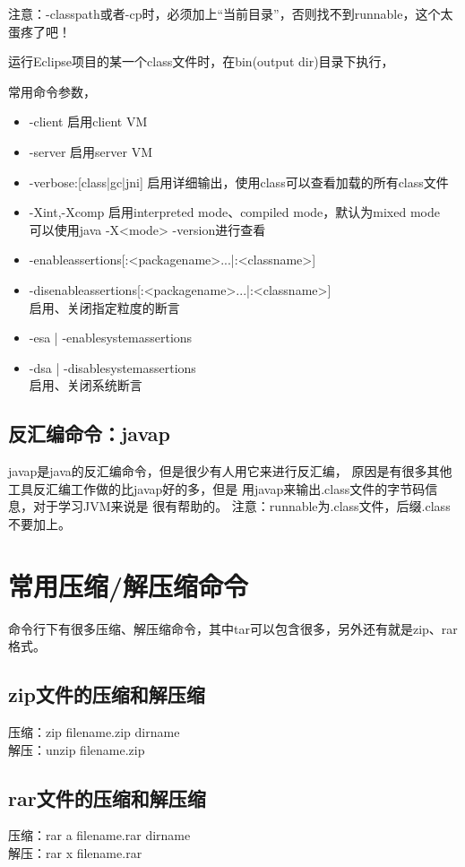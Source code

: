 ﻿\documentclass[a4paper,11pt]{article}
\begin{document}
  注意：-classpath或者-cp时，必须加上“当前目录”，否则找不到runnable，这个太蛋疼了吧！

  运行Eclipse项目的某一个class文件时，在bin(output dir)目录下执行，

  常用命令参数，

  \begin{itemize}
    \item -client 启用client VM
    \item -server 启用server VM
    \item -verbose:[class|gc|jni] 启用详细输出，使用class可以查看加载的所有class文件
    \item -Xint,-Xcomp 启用interpreted mode、compiled mode，默认为mixed mode\\
    可以使用java -X<mode> -version进行查看
    \item -enableassertions[:<packagename>...|:<classname>]
    \item -disenableassertions[:<packagename>...|:<classname>]\\
    启用、关闭指定粒度的断言
    \item  -esa | -enablesystemassertions
    \item -dsa | -disablesystemassertions\\
    启用、关闭系统断言
  \end{itemize}

  \subsection[反汇编命令：javap]{反汇编命令：javap}
  javap是java的反汇编命令，但是很少有人用它来进行反汇编，
  原因是有很多其他工具反汇编工作做的比javap好的多，但是
  用javap来输出.class文件的字节码信息，对于学习JVM来说是
  很有帮助的。
  注意：runnable为.class文件，后缀.class不要加上。

  \section[常用压缩/解压缩命令]{常用压缩/解压缩命令}
  命令行下有很多压缩、解压缩命令，其中tar可以包含很多，另外还有就是zip、rar格式。
  \subsection[zip文件的压缩和解压缩]{zip文件的压缩和解压缩}
  压缩：zip filename.zip dirname\\
  解压：unzip filename.zip
  \subsection[rar文件的压缩和解压缩]{rar文件的压缩和解压缩}
  压缩：rar a filename.rar dirname\\
  解压：rar x filename.rar
\end{document}
